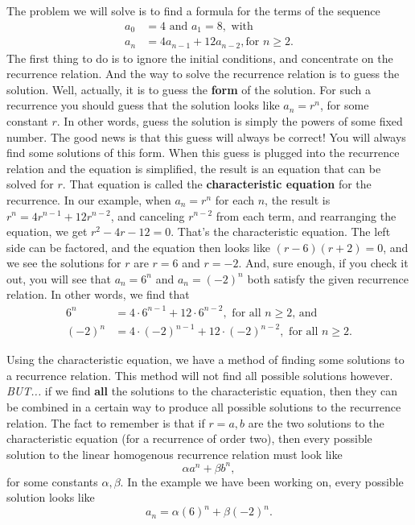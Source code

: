 The problem we will solve is to find a formula for the terms of
the sequence
\begin{align*}
 a_0 &= 4 \text{ and } a_1 = 8, \text{ with} \\
 a_n &= 4a_{n-1}+12a_{n-2}, \text{for $n\geq2$.}
\end{align*}
The first thing to do is to ignore the initial conditions, and
concentrate on the recurrence relation. And the way to solve the
recurrence relation is to guess the solution. Well, actually, it is to
guess the {\bfseries form} of the solution. 
For such a recurrence you should
guess that the solution looks like $a_n=r^n$, for some constant $r$.
In other words, guess the solution is simply the powers of some fixed
number. The good news is that this guess will always be correct! You
will always find some solutions of this form. When this guess is plugged
into the recurrence relation and the equation is simplified, the result
is an equation that can be solved for $r$. That equation is called the
{\bfseries characteristic equation} for the recurrence.  In our example, when
$a_n=r^n$ for each $n$, the result is $r^n=4r^{n-1}+12r^{n-2}$, and
canceling $r^{n-2}$ from each term, and rearranging the equation, we get
$r^2-4r-12=0$. That's the characteristic equation. The left side can
be factored, and the equation then looks like $(r-6)(r+2)=0$, and we see
the solutions for $r$ are $r=6$ and $r=-2$. And, sure enough, if you
check it out, you will see that $a_n=6^n$ and $a_n=(-2)^n$ both satisfy
the given recurrence relation.  In other words, we find that
\begin{align*}
    6^n &=4\cdot6^{n-1}+12\cdot6^{n-2}, \text{ for all $n\geq2$, and} \\ 
 (-2)^n &=4\cdot(-2)^{n-1}+12\cdot(-2)^{n-2}, \text{ for all $n\geq2$.}
\end{align*}

Using the characteristic equation, we have a method of finding
some solutions to a recurrence relation.  This method will not find all
possible solutions however.  \emph{BUT...} if we find {\bfseries all} the solutions
to the characteristic equation, then they can be combined in a certain
way to produce all possible solutions to the recurrence relation. The
fact to remember is that if $r=a,b$ are the two solutions
to the characteristic equation (for a recurrence of order two), then
every possible solution to the linear homogenous recurrence relation
must look like 
\[
\alpha a^n+\beta b^n,
\]
for some constants $\alpha,\beta$. In the
example we have been working on, every possible solution looks like
\[
  a_n=\alpha (6)^n+\beta (-2)^n.
\]

